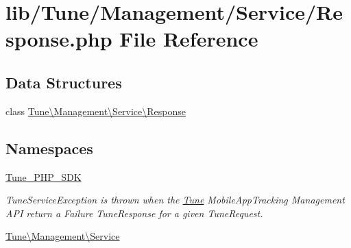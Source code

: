 \hypertarget{Response_8php}{\section{lib/\-Tune/\-Management/\-Service/\-Response.php File Reference}
\label{Response_8php}
}
\subsection*{Data Structures}
\begin{DoxyCompactItemize}
\item 
class \hyperlink{classTune_1_1Management_1_1Service_1_1Response}{Tune\textbackslash{}\-Management\textbackslash{}\-Service\textbackslash{}\-Response}
\end{DoxyCompactItemize}
\subsection*{Namespaces}
\begin{DoxyCompactItemize}
\item 
\hyperlink{namespaceTune__PHP__SDK}{Tune\-\_\-\-P\-H\-P\-\_\-\-S\-D\-K}
\begin{DoxyCompactList}\small\item\em Tune\-Service\-Exception is thrown when the \hyperlink{namespaceTune}{Tune} Mobile\-App\-Tracking Management A\-P\-I return a Failure Tune\-Response for a given Tune\-Request. \end{DoxyCompactList}\item 
\hyperlink{namespaceTune_1_1Management_1_1Service}{Tune\textbackslash{}\-Management\textbackslash{}\-Service}
\end{DoxyCompactItemize}
